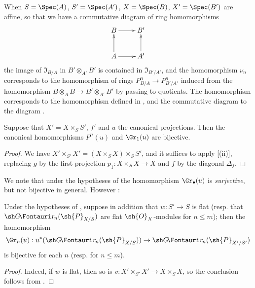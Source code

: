 \begin{env}[16.4.4]
\label{IV.16.4.4}
When $S = \Spec(A)$, $S' = \Spec(A')$, $X = \Spec(B)$, $X' = \Spec(B')$ are affine, so that we have a commutative diagram of ring homomorphisms
\[
  \xymatrix{
    B \ar[r] & B' \\
    A \ar[u] \ar[r] & A' \ar[u]
  }
\]
the image of $\mathfrak{I}_{B/A}$ in $B' \otimes_{A'} B'$ is contained in $\mathfrak{I}_{B'/A'}$, and the homomorphism $\nu_n$ corresponds to the homomorphism of rings $P_{B/A}^n \to P_{B'/A'}^n$ induced from the homomorphism $B \otimes_A B \to B' \otimes_{A'} B'$ by passing to quotients.
The homomorphism  corresponds to the homomorphism defined in , and the commutative diagram  to the diagram .
\end{env}

\begin{proposition}[16.4.5]
\label{IV.16.4.5}
Suppose that $X' = X \times_S S'$, $f'$ and $u$ the canonical projections.
Then the canonical homomorphisms $P^n(u)$  and $\Gr_1(u)$  are bijective.
\end{proposition}

\begin{proof}
We have $X' \times_{S'} X' = (X \times_S X) \times_S S'$, and it suffices to apply [(ii)], replacing $g$ by the first projection $p_1:X\times_S X \to X$ and $f$ by the diagonal $\Delta_f$.
\end{proof}

We note that under the hypotheses of  the homomorphism $\Gr_\bullet(u)$  is \emph{surjective}, but not bijective in general. 
However :

\begin{corollary}[16.4.6]
\label{IV.16.4.6}
Under the hypotheses of , suppose in addition that $w: S' \to S$ is flat (resp. that $\shGr_n(\sh{P}_{X/S})$ are flat $\sh{O}_X$-modules for $n \leq m$);
then the homomorphism
\[
  \Gr_n(u):u^*(\shGr_n(\sh{P}_{X/S})) \to \shGr_n(\sh{P}_{X'/S'})
\]
is bijective for each $n$ (resp. for $n \leq m$).
\end{corollary}

\begin{proof}
Indeed, if $w$ is flat, then so is $v: X' \times_{S'} X' \to X \times_S X$, so the conclusion follows from .
\end{proof}

